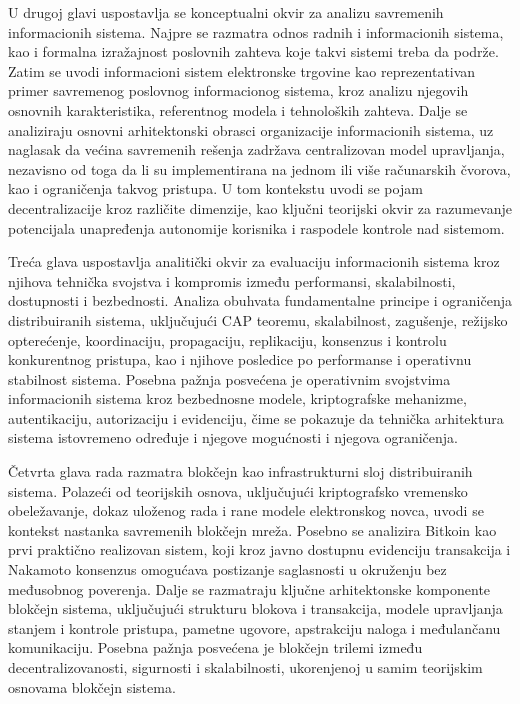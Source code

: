 U drugoj glavi uspostavlja se konceptualni okvir za analizu savremenih informacionih sistema. Najpre se razmatra odnos radnih i informacionih sistema, kao i formalna izražajnost poslovnih zahteva koje takvi sistemi treba da podrže. Zatim se uvodi informacioni sistem elektronske trgovine kao reprezentativan primer savremenog poslovnog informacionog sistema, kroz analizu njegovih osnovnih karakteristika, referentnog modela i tehnoloških zahteva. Dalje se analiziraju osnovni arhitektonski obrasci organizacije informacionih sistema, uz naglasak da većina savremenih rešenja zadržava centralizovan model upravljanja, nezavisno od toga da li su implementirana na jednom ili više računarskih čvorova, kao i ograničenja takvog pristupa. U tom kontekstu uvodi se pojam decentralizacije kroz različite dimenzije, kao ključni teorijski okvir za razumevanje potencijala unapređenja autonomije korisnika i raspodele kontrole nad sistemom.

Treća glava uspostavlja analitički okvir za evaluaciju informacionih sistema kroz njihova tehnička svojstva i kompromis između performansi, skalabilnosti, dostupnosti i bezbednosti. Analiza obuhvata fundamentalne principe i ograničenja distribuiranih sistema, uključujući CAP teoremu, skalabilnost, zagušenje, režijsko opterećenje, koordinaciju, propagaciju, replikaciju, konsenzus i kontrolu konkurentnog pristupa, kao i njihove posledice po performanse i operativnu stabilnost sistema. Posebna pažnja posvećena je operativnim svojstvima informacionih sistema kroz bezbednosne modele, kriptografske mehanizme, autentikaciju, autorizaciju i evidenciju, čime se pokazuje da tehnička arhitektura sistema istovremeno određuje i njegove mogućnosti i njegova ograničenja.

Četvrta glava rada razmatra blokčejn kao infrastrukturni sloj distribuiranih sistema. Polazeći od teorijskih osnova, uključujući kriptografsko vremensko obeležavanje, dokaz uloženog rada i rane modele elektronskog novca, uvodi se kontekst nastanka savremenih blokčejn mreža. Posebno se analizira Bitkoin kao prvi praktično realizovan sistem, koji kroz javno dostupnu evidenciju transakcija i Nakamoto konsenzus omogućava postizanje saglasnosti u okruženju bez međusobnog poverenja. Dalje se razmatraju ključne arhitektonske komponente blokčejn sistema, uključujući strukturu blokova i transakcija, modele upravljanja stanjem i kontrole pristupa, pametne ugovore, apstrakciju naloga i međulančanu komunikaciju. Posebna pažnja posvećena je blokčejn trilemi između decentralizovanosti, sigurnosti i skalabilnosti, ukorenjenoj u samim teorijskim osnovama blokčejn sistema. 


